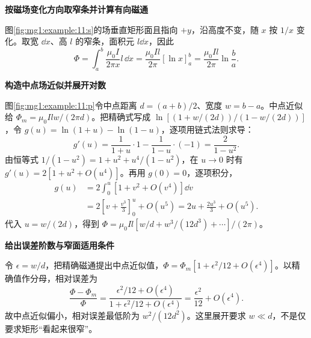 \begin{solution}\textbf{按磁场变化方向取窄条并计算有向磁通}\par\nobreak
图\ref{fig:mg1:example:11:s}的场垂直矩形面且指向 $+y$，沿高度不变，随 $x$ 按 $1/x$ 变化。取宽 $\dd x$、高 $l$ 的窄条，面积元 $l\dd x$，因此
\[
\Phi=\int_a^b\frac{\mu_0I}{2\pi x}l\,\dd x
=\frac{\mu_0Il}{2\pi}[\ln x]_a^b
=\frac{\mu_0Il}{2\pi}\ln\frac ba.
\]



\par\medskip{}\noindent\textbf{构造中点场近似并展开对数}\par\nobreak
图\ref{fig:mg1:example:11:p}令中点距离 $d=(a+b)/2$、宽度 $w=b-a$。中点近似给 $\Phi_m=\mu_0Ilw/(2\pi d)$。把精确式写成 $\ln[(1+w/(2d))/(1-w/(2d))]$，令 $g(u)=\ln(1+u)-\ln(1-u)$，逐项用链式法则求导：
\[
 g'(u)=\frac1{1+u}\cdot1-\frac1{1-u}\cdot(-1)
 =\frac2{1-u^2}.
\]
由恒等式 $1/(1-u^2)=1+u^2+u^4/(1-u^2)$，在 $u\to0$ 时有 $g'(u)=2[1+u^2+O(u^4)]$。再用 $g(0)=0$，逐项积分，
\[
 \begin{aligned}
 g(u)&=2\int_0^u[1+v^2+O(v^4)]\dd v\\
 &=2\left[v+\frac{v^3}{3}\right]_0^u+O(u^5)
 =2u+\frac{2u^3}{3}+O(u^5).
 \end{aligned}
\]
代入 $u=w/(2d)$，得到 $\Phi=\mu_0Il[w/d+w^3/(12d^3)+\cdots]/(2\pi)$。

\par\medskip{}\noindent\textbf{给出误差阶数与窄面适用条件}\par\nobreak
令 $\epsilon=w/d$，把精确磁通提出中点近似值，$\Phi=\Phi_m[1+\epsilon^2/12+O(\epsilon^4)]$。以精确值作分母，相对误差为
\[
 \frac{\Phi-\Phi_m}{\Phi}
 =\frac{\epsilon^2/12+O(\epsilon^4)}{1+\epsilon^2/12+O(\epsilon^4)}
 =\frac{\epsilon^2}{12}+O(\epsilon^4).
\]
故中点近似偏小，相对误差最低阶为 $w^2/(12d^2)$。这里展开要求 $w\ll d$，不是仅要求矩形“看起来很窄”。\end{solution}
